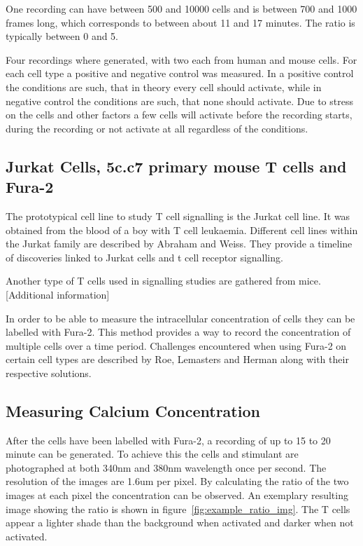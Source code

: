 One recording can have between 500 and 10000 cells and is between 700 and 1000 frames long, which corresponds to between about 11 and 17 minutes. The ratio is typically between 0 and 5.

Four recordings where generated, with two each from human and mouse cells. For each cell type a positive and negative control was measured. In a positive control the conditions are such, that in theory every cell should activate, while in negative control the conditions are such, that none should activate. Due to stress on the cells and other factors a few cells will activate before the recording starts, during the recording or not activate at all regardless of the conditions.

\subsection{Jurkat Cells, 5c.c7 primary mouse T cells and Fura-2}

The prototypical cell line to study T cell signalling is the Jurkat cell line.\cite{morgan2023} It was obtained from the blood of a boy with T cell leukaemia.\cite{schneider1977} Different cell lines within the Jurkat family are described by Abraham and Weiss.\cite{abraham2004} They provide a timeline of discoveries linked to Jurkat cells and t cell receptor signalling.

Another type of T cells used in signalling studies are gathered from mice. [Additional information]

In order to be able to measure the intracellular \Calcium concentration of cells they can be labelled with Fura-2. This method provides a way to record the \Calcium concentration of multiple cells over a time period.\cite{martinez2017} Challenges encountered when using Fura-2 on certain cell types are described by Roe, Lemasters and Herman along with their respective solutions.\cite{roe1990}

\subsection{Measuring Calcium Concentration}

After the cells have been labelled with Fura-2, a recording of up to 15 to 20 minute can be generated. To achieve this the cells and stimulant are photographed at both 340nm and 380nm wavelength once per second. The resolution of the images are 1.6um per pixel. By calculating the ratio of the two images at each pixel the \Calcium concentration can be observed. An exemplary resulting image showing the ratio is shown in figure~\ref{fig:example_ratio_img}. The T cells appear a lighter shade than the background when activated and darker when not activated.

